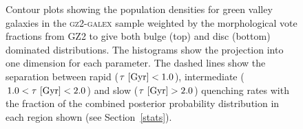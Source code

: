 \begin{figure}
\caption[Smooth and disc weighted population densities of green valley galaxies]{Contour plots showing the population densities for green valley galaxies in the \textsc{gz2-galex} sample weighted by the morphological vote fractions from GZ2 to give both bulge (top) and disc (bottom) dominated distributions. The histograms show the projection into one dimension for each parameter. The dashed lines show the separation between rapid ($\tau ~\rm{[Gyr]} < 1.0$), intermediate ($1.0 < \tau ~\rm{[Gyr]} < 2.0$) and slow ($\tau ~\rm{[Gyr]} > 2.0$) quenching rates with the fraction of the combined posterior probability distribution in each region shown (see Section~\ref{stats}).}
\label{green_v}
\end{figure}

